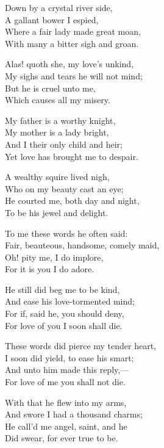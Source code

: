 \settowidth{\versewidth}{Where a fair lady made great moan,}
\begin{dcverse}\footnotesize
Down by a crystal river side,\\
A gallant bower I espied,\\
Where a fair lady made great moan,\\
With many a bitter sigh and groan.

Alas! quoth she, my love's unkind,\\
My sighs and tears he will not mind;\\
But he is cruel unto me,\\
Which causes all my misery.

My father is a worthy knight,\\
My mother is a lady bright,\\
And I their only child and heir;\\
Yet love has brought me to despair.

A wealthy squire lived nigh,\\
Who on my beauty cast an eye;\\
He courted me, both day and night,\\
To be his jewel and delight.

To me these words he often said:\\
Fair, beauteous, handsome, comely maid,\\
Oh! pity me, I do implore,\\
For it is you I do adore.

He still did beg me to be kind,\\
And ease his love-tormented mind;\\
For if, said he, you should deny,\\
For love of you I soon shall die.

These words did pierce my tender heart,\\
I soon did yield, to ease his smart;\\
And unto him made this reply,—\\
For love of me you shall not die.

With that he flew into my arms,\\
And swore I had a thousand charms;\\
He call’d me angel, saint, and he\\
Did swear, for ever true to be.
\end{dcverse}

\pagebreak

